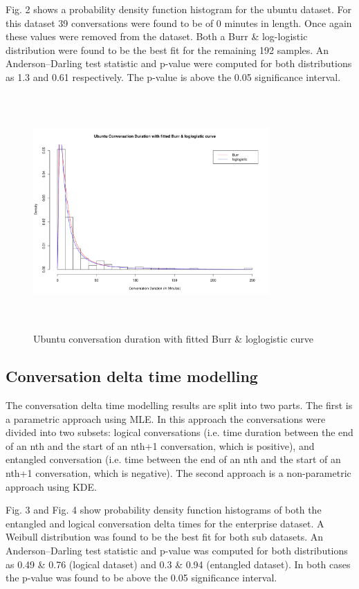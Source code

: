 \documentclass[conference]{IEEEtran}
\begin{document}
Fig. 2 shows a probability density function histogram for the ubuntu dataset. For this dataset 39 conversations were found to be of 0 minutes in length. Once again these values were removed from the dataset. Both a Burr & log-logistic distribution were found to be the best fit for the remaining 192 samples. An Anderson--Darling test statistic and p-value were computed for both distributions as 1.3 and 0.61 respectively. The p-value is above the 0.05 significance interval.

\begin{figure}
\begin{center}
\includegraphics[height=9cm, width=9cm]{02_duration_ubuntu.pdf} 
\caption{Ubuntu conversation duration with fitted Burr & loglogistic curve}
\end{center}
\label{fig:duration_ubun}
\end{figure}


\subsection{Conversation delta time modelling}

The conversation delta time modelling results are split into two parts. The first is a parametric approach using MLE. In this approach the conversations were divided into two subsets: logical conversations (i.e. time duration between the end of an nth and the start of an nth+1 conversation, which is positive), and entangled conversation (i.e. time between the end of an nth and the start of an nth+1 conversation, which is negative). The second approach is a non-parametric approach using KDE.

Fig. 3 and Fig. 4 show probability density function histograms of both the entangled and logical conversation delta times for the enterprise dataset.  A Weibull distribution was found to be the best fit for both sub datasets.  An Anderson--Darling test statistic and p-value was computed for both distributions as 0.49 \& 0.76 (logical dataset) and 0.3 \& 0.94 (entangled dataset). In both cases the p-value was found to be above the 0.05 significance interval.
\end{document}
